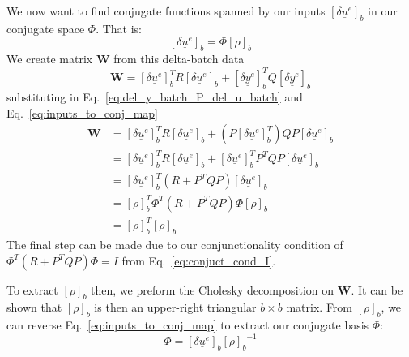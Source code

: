 We now want to find conjugate functions spanned by our inputs ${\left[\delta\underline{u}^e\right]}_b$ in our conjugate space $\Phi$. That is:
\begin{equation}
    {\left[\delta\underline{u}^e\right]}_b = \Phi {\left[\rho\right]}_b
    \label{eq:inputs_to_conj_map}
\end{equation}
We create matrix \textbf{W} from this delta-batch data
\begin{equation}
        \textbf{W} = {{\left[\delta\underline{u}^e\right]}_b^T} R {\left[\delta\underline{u}^e\right]}_b + {{\left[\delta\underline{y}^e\right]}_b^T} Q {\left[\delta\underline{y}^e\right]}_b
\end{equation}
substituting in Eq.~\ref{eq:del_y_batch_P_del_u_batch} and Eq.~\ref{eq:inputs_to_conj_map}
\begin{equation}
    \begin{split}
        \textbf{W} &= {{\left[\delta\underline{u}^e\right]}_b^T} R {\left[\delta\underline{u}^e\right]}_b + {(P {\left[\delta\underline{u}^e\right]}_b^T)} Q P {\left[\delta\underline{u}^e\right]}_b \\
        &= {{\left[\delta\underline{u}^e\right]}_b^T} R {\left[\delta\underline{u}^e\right]}_b +  {{\left[\delta\underline{u}^e\right]}_b^T} P^T Q P {\left[\delta\underline{u}^e\right]}_b \\
        &= {{\left[\delta\underline{u}^e\right]}_b^T} \left(R + P^T Q P\right) {\left[\delta\underline{u}^e\right]}_b \\
        &= {{\left[\rho\right]}_b^T} \Phi^T \left(R + P^T Q P\right) \Phi {\left[\rho\right]}_b \\
        &= {{\left[\rho\right]}_b^T} {{\left[\rho\right]}_b}
    \end{split}
    \label{eq:w_for_batch}
\end{equation}
The final step can be made due to our conjunctionality condition of $\Phi^T \left(R + P^T Q P\right) \Phi = I$ from Eq.~\ref{eq:conjuct_cond_I}.

To extract ${{\left[\rho\right]}_b}$ then, we preform the Cholesky decomposition on $\textbf{W}$. It can be shown that ${{\left[\rho\right]}_b}$ is then an upper-right triangular $b \times b$ matrix. From ${{\left[\rho\right]}_b}$, we can reverse Eq.~\ref{eq:inputs_to_conj_map} to extract our conjugate basis $\Phi$:
\begin{equation}
    \Phi = {\left[\delta\underline{u}^e\right]}_b {{\left[\rho\right]}_b}^{-1}
    \label{eq:conj_from_rho}
\end{equation}

